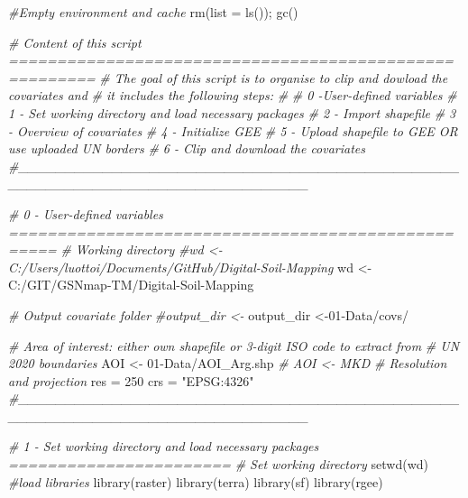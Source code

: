\documentclass[
  10pt,
  b5paper,
  oneside]{book}
\newenvironment{Shaded}{\begin{snugshade}}{\end{snugshade}}
\newcommand{\AttributeTok}[1]{\textcolor[rgb]{0.77,0.63,0.00}{#1}}
\newcommand{\CommentTok}[1]{\textcolor[rgb]{0.56,0.35,0.01}{\textit{#1}}}
\newcommand{\DecValTok}[1]{\textcolor[rgb]{0.00,0.00,0.81}{#1}}
\newcommand{\FunctionTok}[1]{\textcolor[rgb]{0.00,0.00,0.00}{#1}}
\newcommand{\NormalTok}[1]{#1}
\newcommand{\OtherTok}[1]{\textcolor[rgb]{0.56,0.35,0.01}{#1}}
\newcommand{\StringTok}[1]{\textcolor[rgb]{0.31,0.60,0.02}{#1}}
\begin{document}
\begin{Shaded}
\begin{Highlighting}[]
\CommentTok{\#Empty environment and cache}
\FunctionTok{rm}\NormalTok{(}\AttributeTok{list =} \FunctionTok{ls}\NormalTok{());}
\FunctionTok{gc}\NormalTok{()}

\CommentTok{\# Content of this script =======================================================}
\CommentTok{\# The goal of this script is to organise to clip and dowload the covariates and }
\CommentTok{\# it includes the following steps:}
\CommentTok{\# }
\CommentTok{\# 0 {-}User{-}defined variables }
\CommentTok{\# 1 {-} Set working directory and load necessary packages}
\CommentTok{\# 2 {-} Import shapefile}
\CommentTok{\# 3 {-} Overview of covariates }
\CommentTok{\# 4 {-} Initialize GEE}
\CommentTok{\# 5 {-} Upload shapefile to GEE OR use uploaded UN borders}
\CommentTok{\# 6 {-} Clip and download the covariates}
\CommentTok{\#\_\_\_\_\_\_\_\_\_\_\_\_\_\_\_\_\_\_\_\_\_\_\_\_\_\_\_\_\_\_\_\_\_\_\_\_\_\_\_\_\_\_\_\_\_\_\_\_\_\_\_\_\_\_\_\_\_\_\_\_\_\_\_\_\_\_\_\_\_\_\_\_\_\_\_\_\_\_\_}


\CommentTok{\# 0 {-} User{-}defined variables ===================================================}
\CommentTok{\# Working directory}
\CommentTok{\#wd \textless{}{-} \textquotesingle{}C:/Users/luottoi/Documents/GitHub/Digital{-}Soil{-}Mapping\textquotesingle{}}
\NormalTok{wd }\OtherTok{\textless{}{-}} \StringTok{\textquotesingle{}C:/GIT/GSNmap{-}TM/Digital{-}Soil{-}Mapping\textquotesingle{}}

\CommentTok{\# Output covariate folder}
\CommentTok{\#output\_dir \textless{}{-}\textquotesingle{}\textquotesingle{}}
\NormalTok{output\_dir }\OtherTok{\textless{}{-}}\StringTok{\textquotesingle{}01{-}Data/covs/\textquotesingle{}}

\CommentTok{\# Area of interest: either own shapefile or 3{-}digit ISO code to extract from }
\CommentTok{\# UN 2020 boundaries}
\NormalTok{AOI }\OtherTok{\textless{}{-}} \StringTok{\textquotesingle{}01{-}Data/AOI\_Arg.shp\textquotesingle{}}
\CommentTok{\# AOI \textless{}{-} \textquotesingle{}MKD\textquotesingle{}}
\CommentTok{\# Resolution and projection}
\NormalTok{res }\OtherTok{=} \DecValTok{250}
\NormalTok{crs }\OtherTok{=} \StringTok{"EPSG:4326"}
\CommentTok{\#\_\_\_\_\_\_\_\_\_\_\_\_\_\_\_\_\_\_\_\_\_\_\_\_\_\_\_\_\_\_\_\_\_\_\_\_\_\_\_\_\_\_\_\_\_\_\_\_\_\_\_\_\_\_\_\_\_\_\_\_\_\_\_\_\_\_\_\_\_\_\_\_\_\_\_\_\_\_\_}

\CommentTok{\#  1 {-} Set working directory and load necessary packages ======================= }
\CommentTok{\# Set working directory}
\FunctionTok{setwd}\NormalTok{(wd)}
\CommentTok{\#load libraries}
\FunctionTok{library}\NormalTok{(raster)}
\FunctionTok{library}\NormalTok{(terra)}
\FunctionTok{library}\NormalTok{(sf)}
\FunctionTok{library}\NormalTok{(rgee)}



\end{Highlighting}
\end{Shaded}
\end{document}
